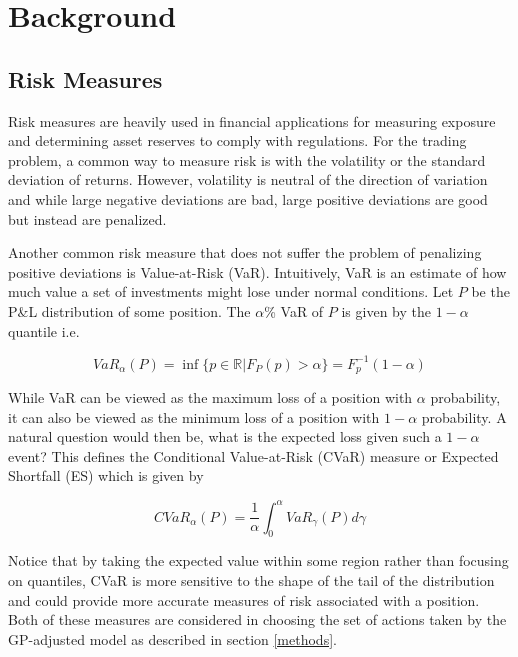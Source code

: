 \documentclass[12pt]{article}
\begin{document}
\section{Background} \label{background}

\subsection{Risk Measures}

Risk measures are heavily used in financial applications for measuring exposure and determining asset reserves to comply with regulations. For the trading problem, a common way to measure risk is with the volatility or the standard deviation of returns. However, volatility is neutral of the direction of variation and while large negative deviations are bad, large positive deviations are good but instead are penalized.

Another common risk measure that does not suffer the problem of penalizing positive deviations is Value-at-Risk (VaR). Intuitively, VaR is an estimate of how much value a set of investments might lose under normal conditions. Let $P$ be the P\&L distribution of some position. The $\alpha$\% VaR of $P$ is given by the $1 - \alpha$ quantile i.e.

\begin{equation}
VaR_{\alpha}(P) = \inf\{p \in \mathbb{R} | F_P(p) > \alpha\} = F^{-1}_p(1 - \alpha)
\label{eq:var}
\end{equation}

While VaR can be viewed as the maximum loss of a position with $\alpha$ probability, it can also be viewed as the minimum loss of a position with $1 - \alpha$ probability. A natural question would then be, what is the expected loss given such a $1 - \alpha$ event? This defines the Conditional Value-at-Risk (CVaR) measure or Expected Shortfall (ES) which is given by

\begin{equation}
CVaR_{\alpha}(P) = \frac{1}{\alpha}\int_0^{\alpha}VaR_{\gamma}(P)d\gamma
\label{eq:cvar}
\end{equation}

Notice that by taking the expected value within some region rather than focusing on quantiles, CVaR is more sensitive to the shape of the tail of the distribution and could provide more accurate measures of risk associated with a position. Both of these measures are considered in choosing the set of actions taken by the GP-adjusted model as described in section \ref{methods}.
\end{document}
